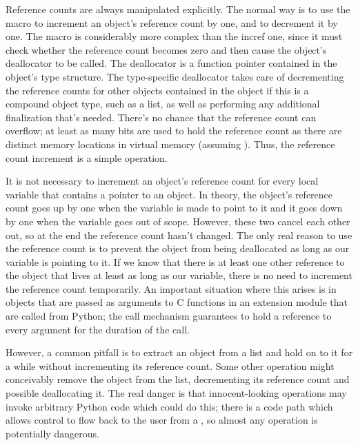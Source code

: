 \documentclass{manual}
\begin{document}
Reference counts are always manipulated explicitly.  The normal way is 
to use the macro  to
increment an object's reference count by one, and
 to decrement it by  
one.  The  macro is considerably more complex
than the incref one, since it must check whether the reference count
becomes zero and then cause the object's deallocator to be called.
The deallocator is a function pointer contained in the object's type
structure.  The type-specific deallocator takes care of decrementing
the reference counts for other objects contained in the object if this
is a compound object type, such as a list, as well as performing any
additional finalization that's needed.  There's no chance that the
reference count can overflow; at least as many bits are used to hold
the reference count as there are distinct memory locations in virtual
memory (assuming ).  Thus, the
reference count increment is a simple operation.

It is not necessary to increment an object's reference count for every 
local variable that contains a pointer to an object.  In theory, the 
object's reference count goes up by one when the variable is made to 
point to it and it goes down by one when the variable goes out of 
scope.  However, these two cancel each other out, so at the end the 
reference count hasn't changed.  The only real reason to use the 
reference count is to prevent the object from being deallocated as 
long as our variable is pointing to it.  If we know that there is at 
least one other reference to the object that lives at least as long as 
our variable, there is no need to increment the reference count 
temporarily.  An important situation where this arises is in objects 
that are passed as arguments to C functions in an extension module 
that are called from Python; the call mechanism guarantees to hold a 
reference to every argument for the duration of the call.

However, a common pitfall is to extract an object from a list and
hold on to it for a while without incrementing its reference count.
Some other operation might conceivably remove the object from the
list, decrementing its reference count and possible deallocating it.
The real danger is that innocent-looking operations may invoke
arbitrary Python code which could do this; there is a code path which
allows control to flow back to the user from a ,
so almost any operation is potentially dangerous.
\end{document}
